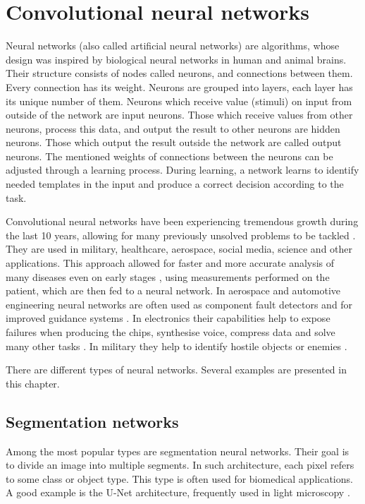 \section{Convolutional neural networks}

Neural networks (also called artificial neural networks) are algorithms, whose design was inspired by biological neural networks in human and animal brains. Their structure consists of nodes called neurons, and connections between them. Every connection has its weight. Neurons are grouped into layers, each layer has its unique number of them. Neurons which receive value (stimuli) on input from outside of the network are input neurons. Those which receive values from other neurons, process this data, and output the result to other neurons are hidden neurons. Those which output the result outside the network are called output neurons. The mentioned weights of connections between the neurons can be adjusted through a learning process. During learning, a network learns to identify needed templates in the input and produce a correct decision according to the task. 

Convolutional neural networks have been experiencing tremendous growth during the last 10 years, allowing for many previously unsolved problems to be tackled \cite{li2021survey}. They are used in military, healthcare, aerospace, social media, science and other applications. This approach allowed for faster and more accurate analysis of many diseases even on early stages \cite{zhou2018unet++}, using measurements performed on the patient, which are then fed to a neural network. In aerospace and automotive engineering neural networks are often used as component fault detectors and for improved guidance systems \cite{yaqoob2019autonomous}. In electronics their capabilities help to expose failures when producing the chips, synthesise voice, compress data and solve many other tasks \cite{gomez2016neural, goyal2018deepzip}. In military they help to identify hostile objects or enemies \cite{wu2015typical}. 


There are different types of neural networks. Several examples are presented in this chapter.

\subsection{Segmentation networks}
Among the most popular types are segmentation neural networks. Their goal is to divide an image into multiple segments. In such architecture, each pixel refers to some class or object type. This type is often used for biomedical applications. A good example is the U-Net architecture, frequently used in light microscopy \cite{ronneberger2015u}.


